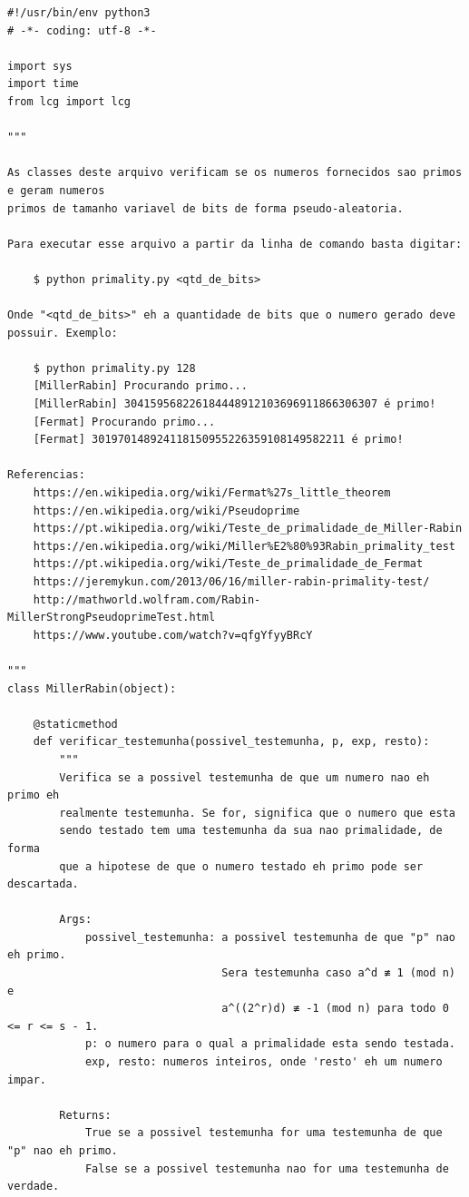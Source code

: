 \documentclass[a4paper,11pt]{article}
\theoremstyle{mytheor}
\begin{document}
\begin{lstlisting}[caption=Arquivo primality.py.]
#!/usr/bin/env python3
# -*- coding: utf-8 -*-

import sys
import time
from lcg import lcg

"""

As classes deste arquivo verificam se os numeros fornecidos sao primos e geram numeros 
primos de tamanho variavel de bits de forma pseudo-aleatoria.

Para executar esse arquivo a partir da linha de comando basta digitar:
    
    $ python primality.py <qtd_de_bits>

Onde "<qtd_de_bits>" eh a quantidade de bits que o numero gerado deve possuir. Exemplo:

    $ python primality.py 128
    [MillerRabin] Procurando primo...
    [MillerRabin] 304159568226184448912103696911866306307 é primo!
    [Fermat] Procurando primo...
    [Fermat] 301970148924118150955226359108149582211 é primo!

Referencias:
    https://en.wikipedia.org/wiki/Fermat%27s_little_theorem
    https://en.wikipedia.org/wiki/Pseudoprime
    https://pt.wikipedia.org/wiki/Teste_de_primalidade_de_Miller-Rabin
    https://en.wikipedia.org/wiki/Miller%E2%80%93Rabin_primality_test
    https://pt.wikipedia.org/wiki/Teste_de_primalidade_de_Fermat
    https://jeremykun.com/2013/06/16/miller-rabin-primality-test/
    http://mathworld.wolfram.com/Rabin-MillerStrongPseudoprimeTest.html
    https://www.youtube.com/watch?v=qfgYfyyBRcY

"""
class MillerRabin(object):

    @staticmethod
    def verificar_testemunha(possivel_testemunha, p, exp, resto):
        """
        Verifica se a possivel testemunha de que um numero nao eh primo eh
        realmente testemunha. Se for, significa que o numero que esta 
        sendo testado tem uma testemunha da sua nao primalidade, de forma
        que a hipotese de que o numero testado eh primo pode ser descartada.

        Args:
            possivel_testemunha: a possivel testemunha de que "p" nao eh primo.
                                 Sera testemunha caso a^d ≢ 1 (mod n) e 
                                 a^((2^r)d) ≢ -1 (mod n) para todo 0 <= r <= s - 1.
            p: o numero para o qual a primalidade esta sendo testada.
            exp, resto: numeros inteiros, onde 'resto' eh um numero impar.

        Returns:
            True se a possivel testemunha for uma testemunha de que "p" nao eh primo.
            False se a possivel testemunha nao for uma testemunha de verdade.


\end{lstlisting}
\end{document}

